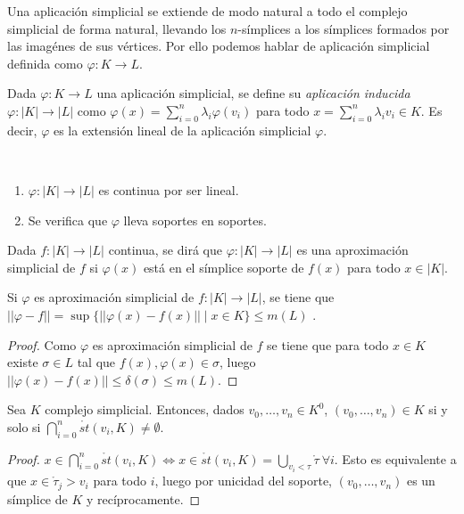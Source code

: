 \documentclass[HS.tex]{subfiles}
\begin{document}
Una aplicación simplicial se extiende de modo natural a todo el complejo simplicial de forma natural, llevando los $n$-símplices a los símplices formados por las imagénes de sus vértices. Por ello podemos hablar de aplicación simplicial definida como $\varphi:K\to L$.


\begin{defi}
Dada $\varphi:K\to L$ una aplicación simplicial, se define su \emph{aplicación inducida} $\varphi:|K|\to|L|$ como $\varphi(x)=\sum_{i=0}^n\lambda_i\varphi(v_i)$ para todo $x=\sum_{i=0}^n\lambda_iv_i\in K$. Es decir, $\varphi$ es la extensión lineal de la aplicación simplicial $\varphi$.
\end{defi}

\begin{nota}\
\begin{enumerate}
\item $\varphi:|K|\to|L|$ es continua por ser lineal.
\item Se verifica que $\varphi$ lleva soportes en soportes.
\end{enumerate}
\end{nota}

\begin{defi}
Dada $f:|K|\to|L|$ continua, se dirá que $\varphi:|K|\to |L|$ es una aproximación simplicial de $f$ si $\varphi(x)$ está en el símplice soporte de $f(x)$ para todo $x\in|K|$.
\end{defi}

\begin{lemma}\label{delta}
Si $\varphi$ es aproximación simplicial de $f:|K|\to|L|$, se tiene que $||\varphi-f||=\sup\{||\varphi(x)-f(x)||\mid x\in K\}\leq m(L)$ .
\end{lemma}
\begin{proof}
Como $\varphi$ es aproximación simplicial de $f$ se tiene que para todo $x\in K$ existe $\sigma\in L$ tal que $f(x),\varphi(x)\in\sigma$, luego $||\varphi(x)-f(x)||\leq\delta(\sigma)\leq m(L)$.
\end{proof}


\begin{lemma}\label{interseccion}
Sea $K$ complejo simplicial. Entonces, dados $v_0,\dots, v_n\in K^0$,  $(v_0,\dots, v_n)\in K$ si y solo si $\bigcap_{i=0}^n\mathring{st}(v_i,K)\neq\emptyset$.
\end{lemma}
\begin{proof}
$x\in \bigcap_{i=0}^n\mathring{st}(v_i,K)\Leftrightarrow x\in \mathring{st}(v_i,K)=\bigcup_{v_i<\tau}\mathring{\tau}\ \forall i$. Esto es equivalente a que $x\in \mathring{\tau}_j>v_i$ para todo $i$, luego por unicidad del soporte, $(v_0,\dots, v_n)$ es un símplice de $K$ y recíprocamente. 
\end{proof}
\end{document}
